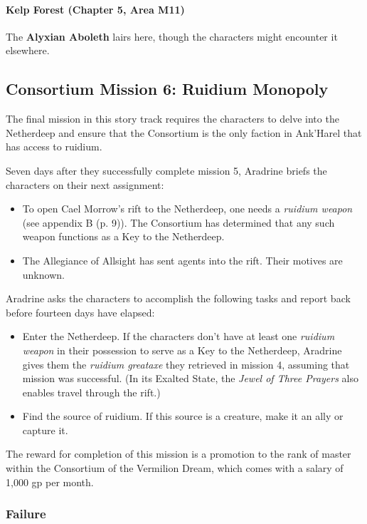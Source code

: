 \documentclass[letterpaper, 11pt, bg=full, twocolumn]{dndbook}
\begin{document}
\paragraph{Kelp Forest (Chapter 5, Area M11)}

The \textbf{Alyxian Aboleth} lairs here, though the characters might encounter it elsewhere.

\subsection{Consortium Mission 6: Ruidium Monopoly}

The final mission in this story track requires the characters to delve into the Netherdeep and ensure that the Consortium is the only faction in Ank'Harel that has access to ruidium.

Seven days after they successfully complete mission 5, Aradrine briefs the characters on their next assignment:

\begin{itemize}
\item To open Cael Morrow's rift to the Netherdeep, one needs a \textit{ruidium weapon} (see appendix B (p. 9)). The Consortium has determined that any such weapon functions as a Key to the Netherdeep.
\item The Allegiance of Allsight has sent agents into the rift. Their motives are unknown.
\end{itemize}

Aradrine asks the characters to accomplish the following tasks and report back before fourteen days have elapsed:

\begin{itemize}
\item Enter the Netherdeep. If the characters don't have at least one \textit{ruidium weapon} in their possession to serve as a Key to the Netherdeep, Aradrine gives them the \textit{ruidium greataxe} they retrieved in mission 4, assuming that mission was successful. (In its Exalted State, the \textit{Jewel of Three Prayers} also enables travel through the rift.)
\item Find the source of ruidium. If this source is a creature, make it an ally or capture it.
\end{itemize}

The reward for completion of this mission is a promotion to the rank of master within the Consortium of the Vermilion Dream, which comes with a salary of 1,000 gp per month.

\subsubsection{Failure}
\end{document}
